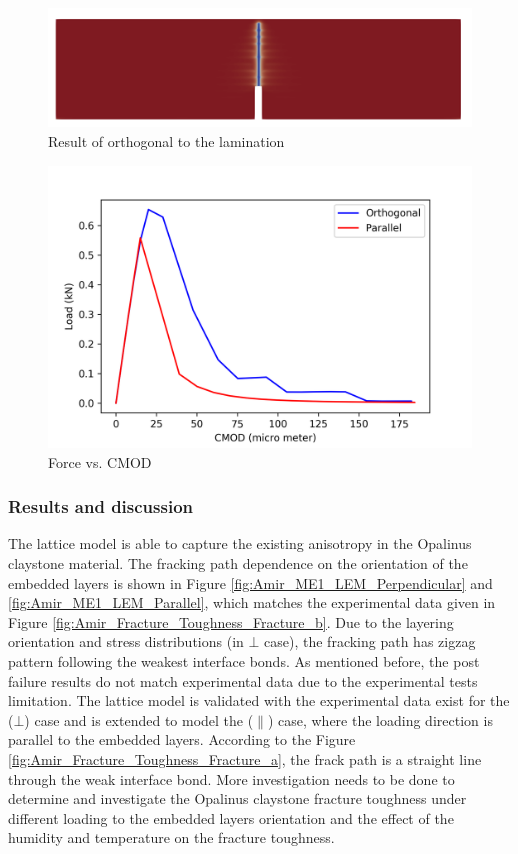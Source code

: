 \begin{figure}[!ht]
\centering
\includegraphics[width=1\textwidth]{figures/ME1_ext_2D_orth_result.png}
\caption{Result of orthogonal to the lamination}
\label{fig:ME1_ext_vpf_orth_result}
\end{figure}

\begin{figure}[!ht]
\centering
\includegraphics[width=1\textwidth]{figures/VPF_ME1_ex_NF_CMOD.png}
\caption{Force vs. CMOD}
\label{fig:ME1_ext_vpf_FvsCMOD}
\end{figure}

\subsubsection{Results and discussion}

The lattice model is able to capture the existing anisotropy in the Opalinus claystone material. The fracking path dependence on the orientation of the embedded layers is shown in Figure \ref{fig:Amir_ME1_LEM_Perpendicular} and \ref{fig:Amir_ME1_LEM_Parallel}, which matches the experimental data given in Figure \ref{fig:Amir_Fracture_Toughness_Fracture_b}. Due to the layering orientation and stress distributions (in $\bot$ case), the fracking path has zigzag pattern following the weakest interface bonds. As mentioned before, the post failure results do not match experimental data due to the experimental tests limitation. The lattice model is validated with the experimental data exist for the ($\bot$) case and is extended to model the ($\parallel$) case, where the loading direction is parallel to the embedded layers. According to the Figure \ref{fig:Amir_Fracture_Toughness_Fracture_a}, the frack path is a straight line through the weak interface bond. More investigation needs to be done to determine and investigate the Opalinus claystone fracture toughness under different loading to the embedded layers orientation and the effect of the humidity and temperature on the fracture toughness. 

